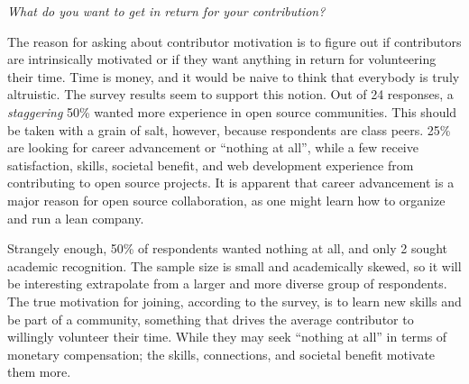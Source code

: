 {\it What do you want to get in return for your contribution?} 

The reason for asking about contributor motivation is to figure out if contributors are intrinsically motivated or if they want anything in return for volunteering their time. Time is money, and it would be naive to think that everybody is truly altruistic. The survey results seem to support this notion. Out of 24 responses, a {\it staggering} 50\% wanted more experience in open source communities. This should be taken with a grain of salt, however, because respondents are class peers. 25\% are looking for career advancement or “nothing at all”, while a few receive satisfaction, skills, societal benefit, and web development experience from contributing to open source projects. It is apparent that career advancement is a major reason for open source collaboration, as one might learn how to organize and run a lean company.

Strangely enough, 50\% of respondents wanted nothing at all, and only 2 sought academic recognition. The sample size is small and academically skewed, so it will be interesting extrapolate from a larger and more diverse group of respondents. The true motivation for joining, according to the survey, is to learn new skills and be part of a community, something that drives the average contributor to willingly volunteer their time. While they may seek “nothing at all” in terms of monetary compensation; the skills, connections, and societal benefit motivate them more.
